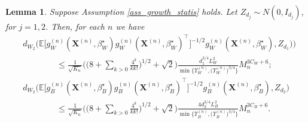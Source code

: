 \documentclass{article}
\newtheorem{Lemma}[Theorem]{Lemma}
\begin{document}
\begin{Lemma} \label{lemma_clt_est_eq}
    Suppose Assumption \ref{ass_growth_statis} holds. Let ${Z}_{d_j} \sim N(0,I_{d_j})$, for $j=1, 2$.  Then, for each $n$ we have
    \begin{align*}
         &d_{W_2}\Big( \mathbb{E}\big[g_W^{(n)}(\mathbf{X}^{(n)},\beta_W^{\star})g_W^{(n)}(\mathbf{X}^{(n)},\beta_W^{\star})^{\top} \big]^{-1/2} g_W^{(n)}(\mathbf{X}^{(n)},\beta_W^{\star}) , {Z}_{d_1})  \Big) \\
         & \qquad \qquad \leq \frac{1}{\sqrt{K_n}} \bigg(\bigg( 8+\sum_{k>0} \frac{4^k}{kk!} \bigg)^{1/2} + \sqrt{2}\bigg) \frac{d_1^{3/4} L_W^2}{\min\big\{\Upsilon_W^{(n)},\big(\Upsilon_W^{(n)}\big)^{3/4}\big\}} { M_n^{3C_W+6} } ; \\
         &d_{W_2}\Big( \mathbb{E}\big[g_B^{(n)}(\mathbf{X}^{(n)},\beta_B^{\star})g_B^{(n)}(\mathbf{X}^{(n)},\beta_B^{\star})^{\top} \big]^{-1/2} g_B^{(n)}(\mathbf{X}^{(n)},\beta_B^{\star}) , {Z}_{d_2}  \Big) \\
         & \qquad \qquad \leq \frac{1}{\sqrt{K_n}} \bigg(\bigg( 8+\sum_{k>0} \frac{4^k}{kk!} \bigg)^{1/2} + \sqrt{2}\bigg) \frac{4d_2^{3/4} L_B^2}{\min\big\{\Upsilon_B^{(n)},\big(\Upsilon_B^{(n)}\big)^{3/4}\big\}} {M_n^{3C_B+6} }.
    \end{align*}
\end{Lemma}
\end{document}
